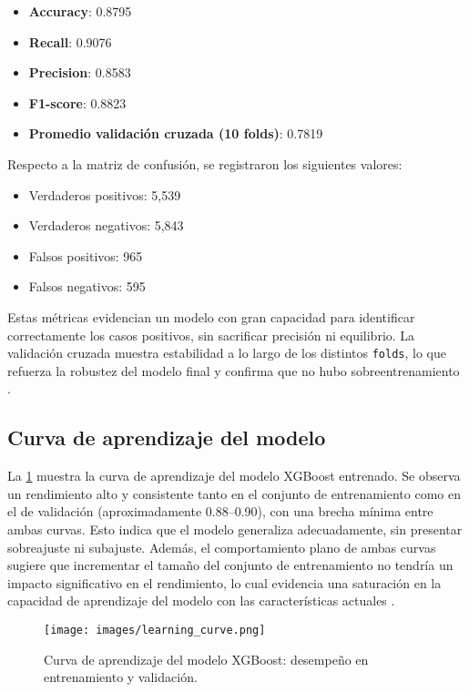 \documentclass[12pt]{article}
\begin{document}
\begin{itemize}
    \item \textbf{Accuracy}: 0.8795
    \item \textbf{Recall}: 0.9076
    \item \textbf{Precision}: 0.8583
    \item \textbf{F1-score}: 0.8823
    \item \textbf{Promedio validación cruzada (10 folds)}: 0.7819
\end{itemize}

\noindent Respecto a la matriz de confusión, se registraron los siguientes valores:

\begin{itemize}
    \item Verdaderos positivos: 5,539
    \item Verdaderos negativos: 5,843
    \item Falsos positivos: 965
    \item Falsos negativos: 595
\end{itemize}

Estas métricas evidencian un modelo con gran capacidad para identificar correctamente los casos positivos, sin sacrificar precisión ni equilibrio. La validación cruzada muestra estabilidad a lo largo de los distintos \texttt{folds}, lo que refuerza la robustez del modelo final y confirma que no hubo sobreentrenamiento \citep{geron2019hands}.

\subsection{Curva de aprendizaje del modelo}

La \cref{fig:learning_curve} muestra la curva de aprendizaje del modelo XGBoost entrenado. Se observa un rendimiento alto y consistente tanto en el conjunto de entrenamiento como en el de validación (aproximadamente 0.88–0.90), con una brecha mínima entre ambas curvas. Esto indica que el modelo generaliza adecuadamente, sin presentar sobreajuste ni subajuste. Además, el comportamiento plano de ambas curvas sugiere que incrementar el tamaño del conjunto de entrenamiento no tendría un impacto significativo en el rendimiento, lo cual evidencia una saturación en la capacidad de aprendizaje del modelo con las características actuales \citep{raschka2018,chen2016}.

\begin{figure}[H]
    \centering
    \texttt{[image: images/learning\_curve.png]}
    \caption{Curva de aprendizaje del modelo XGBoost: desempeño en entrenamiento y validación.}
    \label{fig:learning_curve}
\end{figure}
\end{document}

